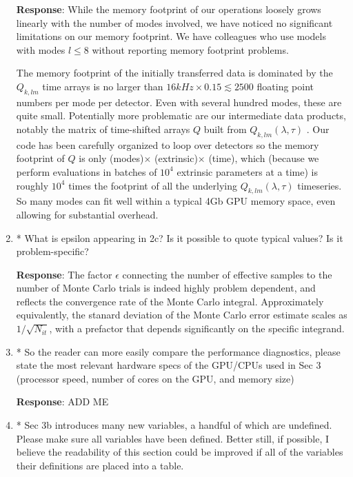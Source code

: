 \documentclass[onecolumn]{revtex4}
\newcommand\editremark[1]{{\color{red} #1}}
\begin{document}
\begin{enumerate}
\noindent \textbf{Response}: While the memory footprint of our operations loosely grows linearly with the number of
modes involved, we have noticed no significant limitations on our memory footprint.  We have colleagues who use models with modes
$l \le 8$ without reporting memory footprint problems.   

The memory footprint of the initially transferred data is dominated by the $Q_{k,lm}$ time arrays is no larger than $16 kHz
\times 0.15  \lesssim 2500$ floating point numbers per mode per detector.  Even with several hundred modes, these are
quite small.
Potentially more problematic are our intermediate data products, notably the matrix of time-shifted arrays $Q$ built
from $Q_{k,lm}(\lambda,\tau)$ .  Our code has been carefully
organized to loop over detectors so the memory footprint of $Q$ is only (modes)$\times$ (extrinsic)$\times$ (time),
which (because we perform evaluations in batches of  $10^4$ extrinsic parameters at a time) is roughly $10^4$ times the
footprint of all the underlying $Q_{k,lm}(\lambda,\tau)$ timeseries.  So many modes can
fit well within a typical 4Gb GPU memory space, even allowing for substantial overhead.


\item * What is epsilon appearing in 2c? Is it possible to quote typical
values? Is it problem-specific?


\noindent \textbf{Response}:   The factor $\epsilon$ connecting the number of effective samples to the number of Monte
Carlo trials is indeed highly problem dependent, and reflects the convergence rate of the Monte Carlo integral.
Approximately equivalently, the stanard deviation of the Monte Carlo error estimate scales as $1/\sqrt{N_{it}}$, with a
prefactor that  depends significantly on the specific integrand.


\item * So the reader can more easily compare the performance diagnostics,
please state the most relevant hardware specs of the GPU/CPUs used in
Sec 3 (processor speed, number of cores on the GPU, and memory size)

\noindent \textbf{Response}:    \editremark{ADD ME}

\item * Sec 3b introduces many new variables, a handful of which are
undefined. Please make sure all variables have been defined. Better
still, if possible, I believe the readability of this section could be
improved if all of the variables their definitions are placed into a
table.


\end{enumerate}
\end{document}
